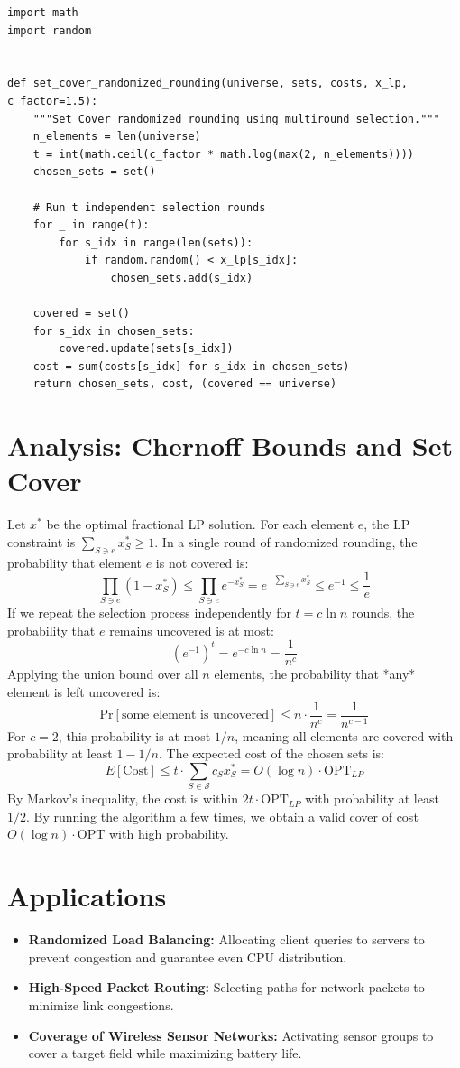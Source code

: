 \begin{lstlisting}[style=python, caption=Randomized Rounding for Set Cover]
import math
import random


def set_cover_randomized_rounding(universe, sets, costs, x_lp, c_factor=1.5):
    """Set Cover randomized rounding using multiround selection."""
    n_elements = len(universe)
    t = int(math.ceil(c_factor * math.log(max(2, n_elements))))
    chosen_sets = set()
    
    # Run t independent selection rounds
    for _ in range(t):
        for s_idx in range(len(sets)):
            if random.random() < x_lp[s_idx]:
                chosen_sets.add(s_idx)
                
    covered = set()
    for s_idx in chosen_sets:
        covered.update(sets[s_idx])
    cost = sum(costs[s_idx] for s_idx in chosen_sets)
    return chosen_sets, cost, (covered == universe)
\end{lstlisting}

\section{Analysis: Chernoff Bounds and Set Cover}
Let $x^*$ be the optimal fractional LP solution. For each element $e$, the LP constraint is $\sum_{S \ni e} x_S^* \ge 1$.
In a single round of randomized rounding, the probability that element $e$ is not covered is:
\[
\prod_{S \ni e} (1 - x_S^*) \le \prod_{S \ni e} e^{-x_S^*} = e^{-\sum_{S \ni e} x_S^*} \le e^{-1} \le \frac{1}{e}
\]
If we repeat the selection process independently for $t = c \ln n$ rounds, the probability that $e$ remains uncovered is at most:
\[
(e^{-1})^t = e^{-c \ln n} = \frac{1}{n^c}
\]
Applying the union bound over all $n$ elements, the probability that *any* element is left uncovered is:
\[
\text{Pr}[\text{some element is uncovered}] \le n \cdot \frac{1}{n^c} = \frac{1}{n^{c-1}}
\]
For $c = 2$, this probability is at most $1/n$, meaning all elements are covered with probability at least $1 - 1/n$.
The expected cost of the chosen sets is:
\[
E[\text{Cost}] \le t \cdot \sum_{S \in \mathcal{S}} c_S x_S^* = O(\log n) \cdot \text{OPT}_{LP}
\]
By Markov's inequality, the cost is within $2 t \cdot \text{OPT}_{LP}$ with probability at least $1/2$. By running the algorithm a few times, we obtain a valid cover of cost $O(\log n) \cdot \text{OPT}$ with high probability.

\section{Applications}
\begin{itemize}
    \item \textbf{Randomized Load Balancing:} Allocating client queries to servers to prevent congestion and guarantee even CPU distribution.
    \item \textbf{High-Speed Packet Routing:} Selecting paths for network packets to minimize link congestions.
    \item \textbf{Coverage of Wireless Sensor Networks:} Activating sensor groups to cover a target field while maximizing battery life.
\end{itemize}

